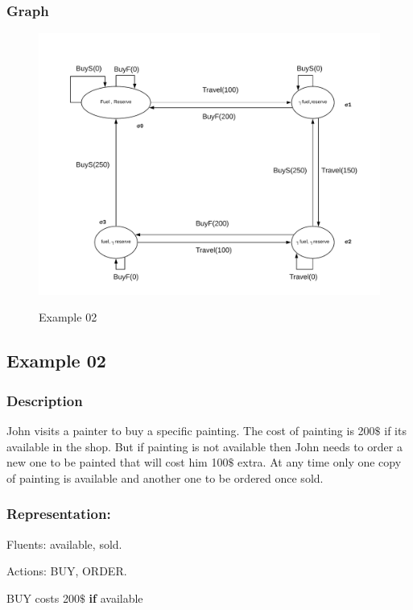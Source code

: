 \documentclass[11pt]{article}
\begin{document}
\subsubsection{Graph}\label{par:p401}
	\begin{figure}[H]
		\includegraphics[width=1\linewidth, height=0.3\textheight]{./media/ex01.png}
		\label{Figure:f01}
		\caption{Example 02}
	\end{figure}
\subsection{Example 02}\label{example:ex02}
\subsubsection{Description}\label{par:p102}
John visits a painter to buy a specific painting. The cost of painting is 200$\$$  if its available in the shop. But if painting is not available then John needs to order a new one to be painted that will cost him 100$\$$  extra. At any time only one copy of painting is available and another one to be ordered once sold.

\subsubsection{Representation:}\label{par:p202}
\indent 
\par Fluents: available, sold.\par
Actions: BUY, ORDER.\par
BUY costs 200$\$$  \textbf{if} available\par
\end{document}
